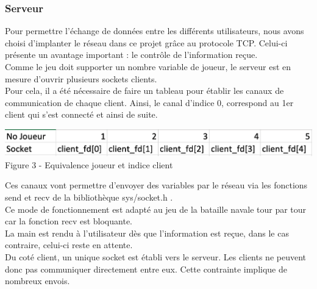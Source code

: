 \documentclass[a4paper,12pt]{article}
\begin{document}
\subsubsection {Serveur}
Pour permettre l'échange de données entre les différents utilisateurs, nous avons choisi d'implanter le réseau dans ce projet grâce au protocole TCP. Celui-ci présente un avantage important : le contrôle de l'information reçue.
    \vspace{2\baselineskip}
\\ Comme le jeu doit supporter un nombre variable de joueur, le serveur est en mesure d'ouvrir plusieurs sockets clients.
\\ Pour cela, il a été nécessaire de faire un tableau pour établir les canaux de communication de chaque client. Ainsi, le canal d’indice 0, correspond au 1er client qui s'est connecté et ainsi de suite.
      \begin{center}
         \includegraphics[width=1\textwidth] {tableau_clients.png}
         Figure 3 - Equivalence joueur et indice client
      \end{center}
       \vspace{2\baselineskip}
 Ces canaux vont permettre d'envoyer des variables par le réseau via les fonctions send et recv de la bibliothèque \og sys/socket.h \fg{}.
\\ Ce mode de fonctionnement est adapté au jeu de la bataille navale tour par tour car la fonction recv est bloquante. 
\\ La main est rendu à l’utilisateur dès que l'information est reçue, dans le cas contraire, celui-ci reste en attente.
    \vspace{2\baselineskip}
\\  Du coté client, un unique socket est établi vers le serveur. Les clients ne peuvent donc pas communiquer directement entre eux. Cette contrainte implique de nombreux envois.
\\ 
\newpage
\end{document}
